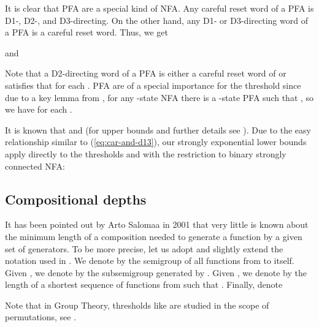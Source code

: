 \documentclass{ws-ijmpc}
\begin{document}
It is clear that PFA are a special kind of NFA. Any careful reset
word of a PFA  is D1-, D2-, and D3-directing. On the other hand,
any D1- or D3-directing word of a PFA is a careful reset word. Thus,
we get

and

Note that a D2-directing word  of a PFA  is either a careful
reset word of  or satisfies that 
for each . PFA are of a special importance for the threshold
 since due to a key lemma from \citep{ITO1short},
for any -state NFA  there is a -state PFA  such that
,
so we have 
for each .

It is known that 
\citep{ITO1short} and 
\citep{MAR6} (for upper bounds and further details see \citep{GAZ1}).
Due to the easy relationship similar to (\ref{eq:car-and-d13}), our
strongly exponential lower bounds apply directly to the thresholds
 and 
with the restriction to binary strongly connected NFA:




\subsection{Compositional depths}

It has been pointed out by Arto Salomaa \citep{SAL4} in 2001 that
very little is known about the minimum length of a composition needed
to generate a function by a given set of generators. To be more precise,
let us adopt and slightly extend the notation used in \citep{SAL4}.
We denote by  the semigroup of all functions from
 to itself. Given ,
we denote by  the subsemigroup
generated by . Given ,
we denote by  the length 
of a shortest sequence  of functions from 
such that . Finally, denote

Note that in Group Theory, thresholds like  are studied in
the scope of permutations, see \citep{HEL1}. 
\end{document}
